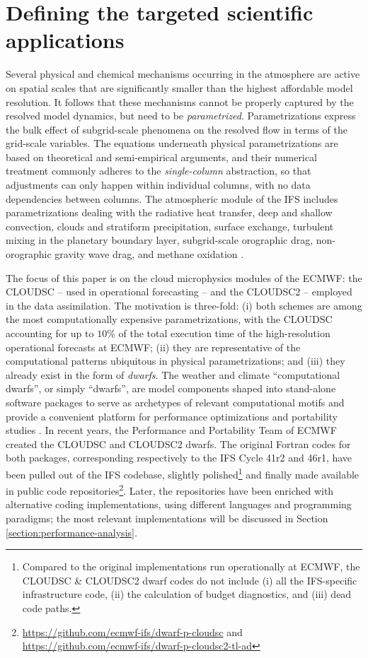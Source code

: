 \documentclass[gmd,manuscript,online]{copernicus}
\theoremstyle{theorem}
\theoremstyle{definition}
\theoremstyle{remark}
\theoremstyle{proposition}
\begin{document}
	\section{Defining the targeted scientific applications}
	\label{section:target-cloud-microphysics-schemes}

	Several physical and chemical mechanisms occurring in the atmosphere are active on spatial scales that are significantly smaller than the highest affordable model resolution. It follows that these mechanisms cannot be properly captured by the resolved model dynamics, but need to be \emph{parametrized}. Parametrizations express the bulk effect of subgrid-scale phenomena on the resolved flow in terms of the grid-scale variables. The equations underneath physical parametrizations are based on theoretical and semi-empirical arguments, and their numerical treatment commonly adheres to the \emph{single-column} abstraction, so that adjustments can only happen within individual columns, with no data dependencies between columns. The atmospheric module of the IFS includes parametrizations dealing with the radiative heat transfer, deep and shallow convection, clouds and stratiform precipitation, surface exchange, turbulent mixing in the planetary boundary layer, subgrid-scale orographic drag, non-orographic gravity wave drag, and methane oxidation \citep{ifs48r1}.

	The focus of this paper is on the cloud microphysics modules of the ECMWF: the CLOUDSC -- used in operational forecasting -- and the CLOUDSC2 -- employed in the data assimilation. The motivation is three-fold: (i) both schemes are among the most computationally expensive parametrizations, with the CLOUDSC accounting for up to $10\%$ of the total execution time of the high-resolution operational forecasts at ECMWF; (ii) they are representative of the computational patterns ubiquitous in physical parametrizations; and (iii) they already exist in the form of \emph{dwarfs}. The weather and climate ``computational dwarfs'', or simply ``dwarfs'', are model components shaped into stand-alone software packages to serve as archetypes of relevant computational motifs \citep{muller19} and provide a convenient platform for performance optimizations and portability studies \citep{bauer20}. In recent years, the Performance and Portability Team of ECMWF created the CLOUDSC and CLOUDSC2 dwarfs. The original Fortran codes for both packages, corresponding respectively to the IFS Cycle 41r2 and 46r1, have been pulled out of the IFS codebase, slightly polished\footnote{Compared to the original implementations run operationally at ECMWF, the CLOUDSC \& CLOUDSC2 dwarf codes do not include (i) all the IFS-specific infrastructure code, (ii) the calculation of budget diagnostics, and (iii) dead code paths.} and finally made available in public code repositories\footnote{\url{https://github.com/ecmwf-ifs/dwarf-p-cloudsc} and \url{https://github.com/ecmwf-ifs/dwarf-p-cloudsc2-tl-ad}}. Later, the repositories have been enriched with alternative coding implementations, using different languages and programming paradigms; the most relevant implementations will be discussed in Section \ref{section:performance-analysis}.
\end{document}
